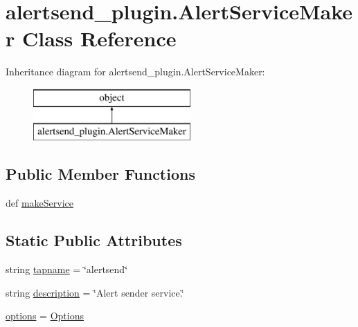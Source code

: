 \hypertarget{classalertsend__plugin_1_1_alert_service_maker}{\section{alertsend\-\_\-plugin.\-Alert\-Service\-Maker Class Reference}
\label{classalertsend__plugin_1_1_alert_service_maker}
}
Inheritance diagram for alertsend\-\_\-plugin.\-Alert\-Service\-Maker\-:\begin{figure}[H]
\begin{center}
\leavevmode
\includegraphics[height=2.000000cm]{classalertsend__plugin_1_1_alert_service_maker}
\end{center}
\end{figure}
\subsection*{Public Member Functions}
\begin{DoxyCompactItemize}
\item 
def \hyperlink{classalertsend__plugin_1_1_alert_service_maker_a776ab9354d7bb4157ccd80edf7bb0826}{make\-Service}
\end{DoxyCompactItemize}
\subsection*{Static Public Attributes}
\begin{DoxyCompactItemize}
\item 
string \hyperlink{classalertsend__plugin_1_1_alert_service_maker_abf35c4fc0c983dfca5201f25cb643a1a}{tapname} = \char`\"{}alertsend\char`\"{}
\item 
string \hyperlink{classalertsend__plugin_1_1_alert_service_maker_ae4010cf4a7c97046d526cee0b1febcf2}{description} = \char`\"{}Alert sender service.\char`\"{}
\item 
\hyperlink{classalertsend__plugin_1_1_alert_service_maker_a3ca254bf6fd586ded22ae26866a8dbb9}{options} = \hyperlink{classalertsend__plugin_1_1_options}{Options}
\end{DoxyCompactItemize}


